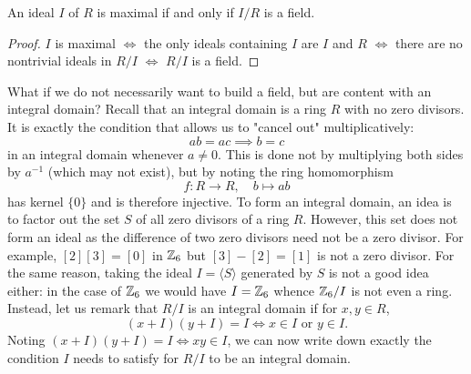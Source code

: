 \begin{prop}\label{ring-over-max-field}
An ideal $I$ of $R$ is maximal if and only if $I/R$ is a field.
\end{prop}
\begin{proof}
$I$ is maximal $\iff$ the only ideals containing $I$ are $I$ and $R$ $\iff$ there are no nontrivial ideals in $R/I$ $\iff$ $R/I$ is a field.

\end{proof}
What if we do not necessarily want to build a field, but are content with an integral domain? Recall that an integral domain is a ring $R$ with no zero divisors. It is exactly the condition that allows us to "cancel out" multiplicatively:
$$ab=ac\implies b=c$$ in an integral domain whenever $a\neq 0$. This is done not by multiplying both sides by $a^{-1}$ (which may not exist), but by noting the ring homomorphism $$f:R\rightarrow R,\quad  b\mapsto ab$$ has kernel $\{0\}$ and is therefore injective. To form an integral domain, an idea is to factor out the set $S$ of all zero divisors of a ring $R$. However, this set does not form an ideal as the difference of two zero divisors need not be a zero divisor. For example, $[2][3]=[0]$ in $\mathbb{Z}_6$ but $[3]-[2]=[1]$ is not a zero divisor. For the same reason, taking the ideal $I=\langle S \rangle$ generated by $S$ is not a good idea either: in the case of $\mathbb{Z}_6$ we would have $I=\mathbb{Z}_6$ whence $\mathbb{Z}_6/I$ is not even a ring. Instead, let us remark that $R/I$ is an integral domain if for $x,y\in R$,
$$(x+I)(y+I)=I\iff x\in I\text{ or } y \in I.$$
Noting $(x+I)(y+I)=I\iff xy\in I$, we can now write down exactly the condition $I$ needs to satisfy for $R/I$ to be an integral domain.

